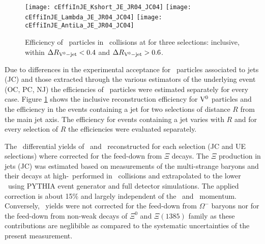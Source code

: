 \begin{figure}[htb]
\begin{center}
\texttt{[image: cEffiInJE\_Kshort\_JE\_JR04\_JC04]}
\texttt{[image: cEffiInJE\_Lambda\_JE\_JR04\_JC04]}
\texttt{[image: cEffiInJE\_AntiLa\_JE\_JR04\_JC04]}
\caption{Efficiency of \Vzero\ particles in \pPb\ collisions at  for three selections: inclusive, within $\Delta R_{{\rm V}^{0}-{\rm jet}} <0.4$ and $\Delta R_{{\rm V}^{0}-{\rm jet}} >0.6$.}
\label{fig:c02EffiIncV0s}
\end{center}
\end{figure}

Due to differences in the experimental acceptance for \Vzero\ particles associated to jets (JC) and those extracted through the various estimators of the underlying event (OC, PC, NJ) the efficiencies of \Vzero\ particles were estimated separately for every case. Figure \ref{fig:c02EffiIncV0s} shows the inclusive reconstruction efficiency for ${\rm V}^{0}$ particles and the efficiency in the events containing a jet for two selections of distance $R$ from the main jet axis. The efficiency for events containing a jet varies with $R$ and for every selection of $R$ the efficiencies were evaluated separately. 


The \pt\ differential yields of \lda\ and \alda\ reconstructed for each selection (JC and UE selections) where corrected for the feed-down from $\Xi$ decays. 
The $\Xi$ production in jets (JC) was estimated based on measurements of the multi-strange baryons and their decays at high-\pt\ performed in \pp\ collisions \cite{Abelev:2012jp} and extrapolated to the lower \pt\ using PYTHIA event generator and full detector simulations.
The applied correction is about 15\% and largely independent of the \lda\ and \alda\ momentum. 
Conversely, \lda\ yields were not corrected for the feed-down from $\Omega^{-}$ baryons nor for the feed-down from non-weak decays of $\Xi^{0}$ and $\Xi(1385)$ family as these contributions are neglibible as compared to the systematic uncertainties of the present measurement.

